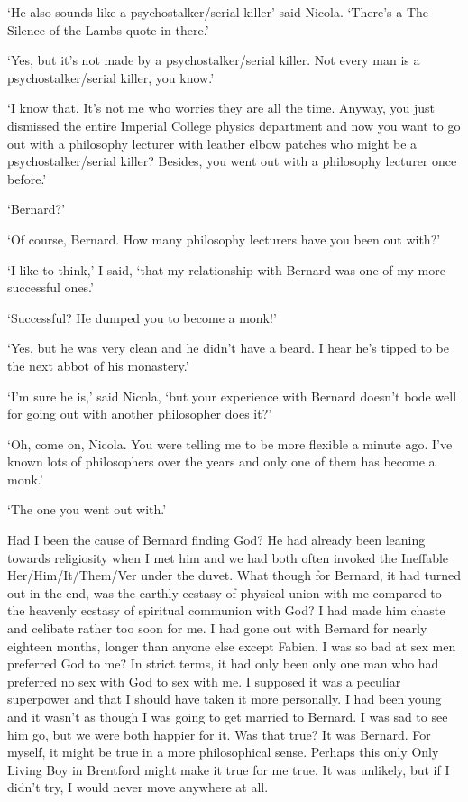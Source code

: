 `He also sounds like a psychostalker/serial killer' said Nicola. `There's a {\twelvesl The Silence of the Lambs\/} quote in there.'

`Yes, but it's not {\twelveit made\/} by a psychostalker/serial killer. Not every man is a psychostalker/serial killer, you know.'

`I know that. It's not me who worries they are all the time. Anyway, you just dismissed the entire Imperial College physics department and now you want to go out with a philosophy lecturer
with leather elbow patches who might be a psychostalker/serial killer? Besides, you went out with a philosophy
lecturer once before.'

`Bernard?'

`Of course, Bernard. How many philosophy lecturers have you been out
with?'

`I like to think,' I said, `that my relationship with Bernard was one
of my more successful ones.'

`Successful? He dumped you to become a monk!'

`Yes, but he was very clean and he didn't have a beard. I hear he's tipped
to be the next abbot of his monastery.'

`I'm sure he is,' said Nicola, `but your experience with Bernard
doesn't bode well for going out with another philosopher does it?'

`Oh, come on, Nicola. You were telling me to be more flexible a
minute ago. I've known lots of philosophers over the years and only
one of them has become a monk.'

`The one you went out with.'

Had I been the cause of Bernard finding God? He had already been leaning towards religiosity when I met him and we had both often invoked the Ineffable Her/Him/It/Them/Ver under the duvet. What though for Bernard, it had turned out in the end, was the earthly ecstasy of physical union with me compared to the heavenly ecstasy of spiritual communion with God? I had made him chaste and celibate rather too soon for me. I had gone out with Bernard for nearly eighteen months, longer than anyone else except Fabien. I was so bad at sex men preferred God to me? In strict terms, it had only been only one man who had preferred no sex with God to sex with me. I supposed it was a peculiar superpower and that I should have taken it more personally. I had been young and it wasn't as though I was going to get married to Bernard. I was sad to see him go, but we were both happier for it. Was that true? It was Bernard. For myself, it might be true in a more philosophical sense. Perhaps this only Only Living Boy in Brentford might make it true for me true. It was unlikely, but if I didn't try, I would never move anywhere at all. 


